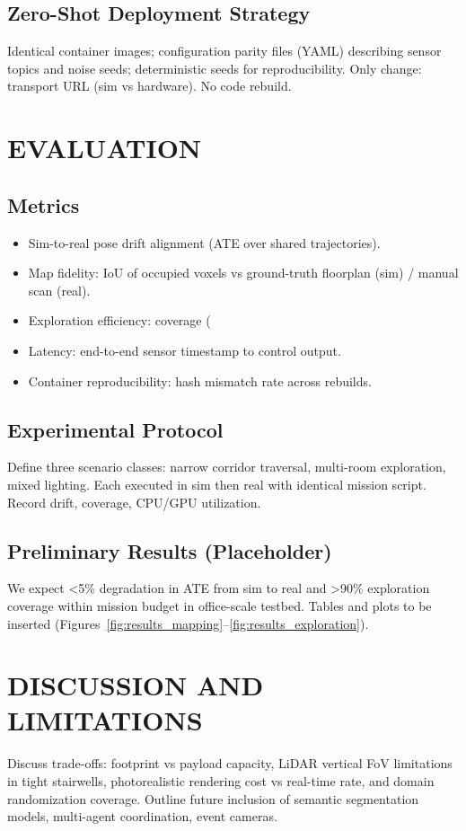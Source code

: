 \documentclass[letterpaper, 10 pt, conference]{ieeeconf}  %
\begin{document}
\subsection{Zero-Shot Deployment Strategy}
Identical container images; configuration parity files (YAML) describing sensor topics and noise seeds; deterministic seeds for reproducibility. Only change: transport URL (sim vs hardware). No code rebuild.

\section{EVALUATION}
\subsection{Metrics}
\begin{itemize}
        \item Sim-to-real pose drift alignment (ATE over shared trajectories).
        \item Map fidelity: IoU of occupied voxels vs ground-truth floorplan (sim) / manual scan (real).
        \item Exploration efficiency: coverage (%
        \item Latency: end-to-end sensor timestamp to control output.
        \item Container reproducibility: hash mismatch rate across rebuilds.
\end{itemize}
\subsection{Experimental Protocol}
Define three scenario classes: narrow corridor traversal, multi-room exploration, mixed lighting. Each executed in sim then real with identical mission script. Record drift, coverage, CPU/GPU utilization.
\subsection{Preliminary Results (Placeholder)}
We expect <5\% degradation in ATE from sim to real and >90\% exploration coverage within mission budget in office-scale testbed. Tables and plots to be inserted (Figures~\ref{fig:results_mapping}--\ref{fig:results_exploration}).

\section{DISCUSSION AND LIMITATIONS}
Discuss trade-offs: footprint vs payload capacity, LiDAR vertical FoV limitations in tight stairwells, photorealistic rendering cost vs real-time rate, and domain randomization coverage. Outline future inclusion of semantic segmentation models, multi-agent coordination, event cameras.
\end{document}

